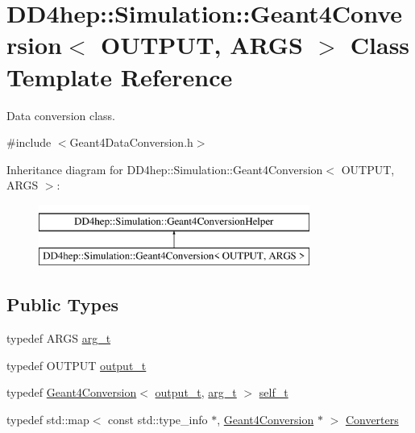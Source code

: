 \hypertarget{class_d_d4hep_1_1_simulation_1_1_geant4_conversion}{}\section{D\+D4hep\+:\+:Simulation\+:\+:Geant4\+Conversion$<$ O\+U\+T\+P\+UT, A\+R\+GS $>$ Class Template Reference}
\label{class_d_d4hep_1_1_simulation_1_1_geant4_conversion}


Data conversion class.  




{\ttfamily \#include $<$Geant4\+Data\+Conversion.\+h$>$}

Inheritance diagram for D\+D4hep\+:\+:Simulation\+:\+:Geant4\+Conversion$<$ O\+U\+T\+P\+UT, A\+R\+GS $>$\+:\begin{figure}[H]
\begin{center}
\leavevmode
\includegraphics[height=2.000000cm]{class_d_d4hep_1_1_simulation_1_1_geant4_conversion}
\end{center}
\end{figure}
\subsection*{Public Types}
\begin{DoxyCompactItemize}
\item 
typedef A\+R\+GS \hyperlink{class_d_d4hep_1_1_simulation_1_1_geant4_conversion_a2a9680db46d2a136982d290c9b11e6f8}{arg\+\_\+t}
\item 
typedef O\+U\+T\+P\+UT \hyperlink{class_d_d4hep_1_1_simulation_1_1_geant4_conversion_a9a6bd3ad991e9d1f61751201d4307d4a}{output\+\_\+t}
\item 
typedef \hyperlink{class_d_d4hep_1_1_simulation_1_1_geant4_conversion}{Geant4\+Conversion}$<$ \hyperlink{class_d_d4hep_1_1_simulation_1_1_geant4_conversion_a9a6bd3ad991e9d1f61751201d4307d4a}{output\+\_\+t}, \hyperlink{class_d_d4hep_1_1_simulation_1_1_geant4_conversion_a2a9680db46d2a136982d290c9b11e6f8}{arg\+\_\+t} $>$ \hyperlink{class_d_d4hep_1_1_simulation_1_1_geant4_conversion_ac48f71e223506f7c92f8358299ac5dfe}{self\+\_\+t}
\item 
typedef std\+::map$<$ const std\+::type\+\_\+info $\ast$, \hyperlink{class_d_d4hep_1_1_simulation_1_1_geant4_conversion}{Geant4\+Conversion} $\ast$ $>$ \hyperlink{class_d_d4hep_1_1_simulation_1_1_geant4_conversion_a1e6c074730135cc207cbd8d8030a189f}{Converters}
\end{DoxyCompactItemize}
